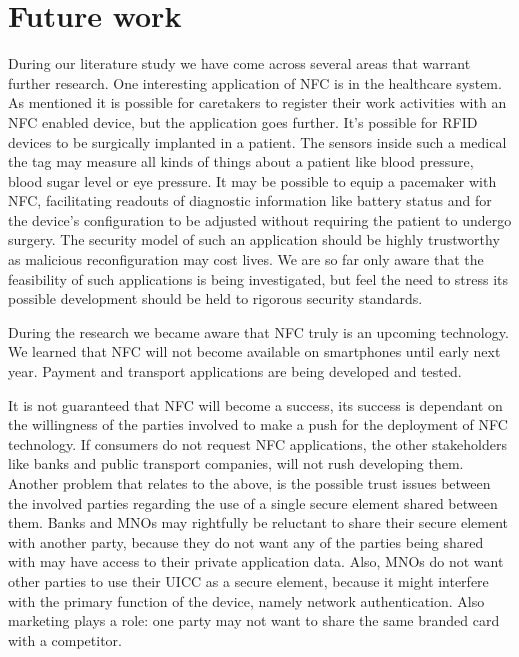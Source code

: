 \section{Future work}
\label{chap:future_work}

During our literature study we have come across several areas that warrant further research.
One interesting application of NFC is in the healthcare system.
As mentioned it is possible for caretakers to register their work activities with an NFC enabled device, but the application goes further.
It's possible for RFID devices to be surgically implanted in a patient.
The sensors inside such a medical the tag may measure all kinds of things about a patient like blood pressure, blood sugar level or eye pressure.
It may be possible to equip a pacemaker with NFC, facilitating readouts of diagnostic information like battery status and for the device's configuration to be adjusted without requiring the patient to undergo surgery. 
The security model of such an application should be highly trustworthy as malicious reconfiguration may cost lives.
We are so far only aware that the feasibility of such applications is being investigated, but feel the need to stress its possible development should be held to rigorous security standards.

During the research we became aware that NFC truly is an upcoming technology.
We learned that NFC will not become available on smartphones until early next year.
Payment and transport applications are being developed and tested.

It is not guaranteed that NFC will become a success, its success is dependant on the willingness of the parties involved to make a push for the deployment of NFC technology.
If consumers do not request NFC applications, the other stakeholders like banks and public transport companies, will not rush developing them.
Another problem that relates to the above, is the possible trust issues between the involved parties regarding the use of a single secure element shared between them.
Banks and MNOs may rightfully be reluctant to share their secure element with another party, because they do not want any of the parties being shared with may have access to their private application data.
Also, MNOs do not want other parties to use their UICC as a secure element, because it might interfere with the primary function of the device, namely network authentication.
Also marketing plays a role: one party may not want to share the same branded card with a competitor.

